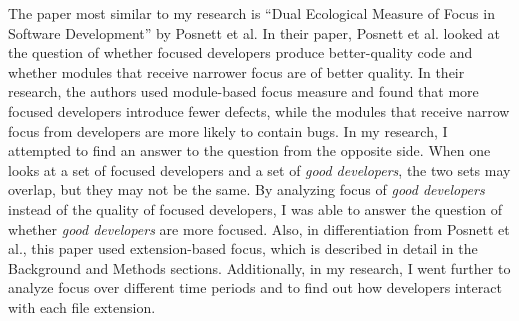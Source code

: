 The paper most similar to my research is “Dual Ecological Measure of Focus in Software Development” by Posnett et al. In their paper, Posnett et al. looked at the question of whether focused developers produce better-quality code and whether modules that receive narrower focus are of better quality\parencite{posnett}. In their research, the authors used module-based focus measure and found that more focused developers introduce fewer defects, while the modules that receive narrow focus from developers are more likely to contain bugs. In my research, I attempted to find an answer to the question from the opposite side. When one looks at a set of focused developers and a set of \textit{good developers}, the two sets may overlap, but they may not be the same. By analyzing focus of \textit{good developers} instead of the quality of focused developers, I was able to answer the question of  whether \textit{good developers} are more focused. Also, in differentiation from Posnett et al., this paper used extension-based focus, which is described in detail in the Background and Methods sections. Additionally, in my research, I went further to analyze focus over different time periods and to find out how developers interact with each file extension.



